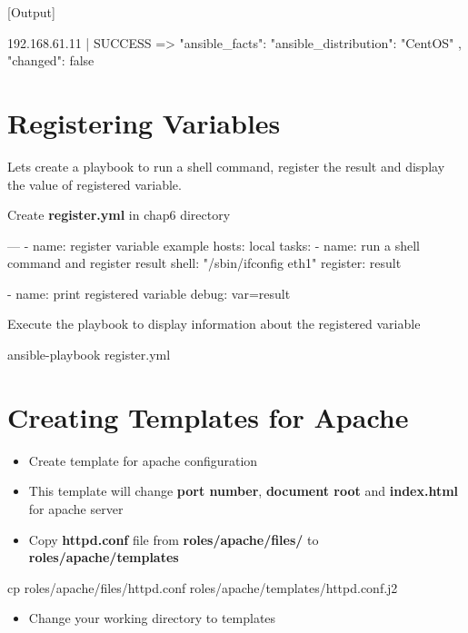 [Output]\newline
\begin{code}
192.168.61.11 | SUCCESS => {
  "ansible_facts": {
      "ansible_distribution": "CentOS"
  },
  "changed": false
}  
\end{code}

\section{Registering  Variables}

Lets create a playbook to run a shell command, register the result and display the value of registered variable.

Create \textbf{register.yml} in chap6 directory

\begin{code}
---
  - name: register variable example
    hosts: local
    tasks:
      - name: run a shell command and register result
        shell: "/sbin/ifconfig eth1"
        register: result

      - name: print registered variable
        debug: var=result
\end{code}

Execute the playbook to display information about the registered variable

\begin{code}
ansible-playbook  register.yml
\end{code}

\section{Creating Templates for Apache}

\begin{itemize}
\item Create template for apache configuration
\item This template will change \textbf{port number}, \textbf{document root} and \textbf{index.html} for  apache server
\item Copy \textbf{httpd.conf} file from \textbf{roles/apache/files/} to \textbf{roles/apache/templates}
\end{itemize}

\begin{code}
cp roles/apache/files/httpd.conf roles/apache/templates/httpd.conf.j2
\end{code}

\begin{itemize}
\item Change your working directory to templates
\end{itemize}

